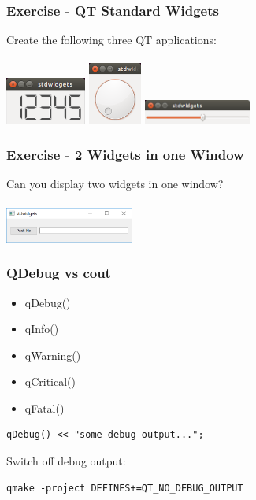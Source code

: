\begin{frame}[fragile]
\frametitle{Exercise - QT Standard Widgets}
\begin{exercise}
Create the following three QT applications:\\
\vspace{5mm}
\\
\includegraphics[width=75pt]{code/qt/stdwidgets/w1.png}
\hspace{5mm}
\includegraphics[width=50pt]{code/qt/stdwidgets/w2.png}
\hspace{5mm}
\includegraphics[width=100pt]{code/qt/stdwidgets/w3.png}
\end{exercise}
\end{frame}

\begin{frame}[fragile]
\frametitle{Exercise - 2 Widgets in one Window}
\begin{exercise}
Can you display two widgets in one window?\\
\vspace{5mm}
\\
\includegraphics[width=120pt]{code/qt/stdwidgets/w4.png}
\end{exercise}
\end{frame}


\begin{frame}[fragile]
\frametitle{QDebug vs cout}
\begin{itemize}
\item qDebug()
\item qInfo()
\item qWarning()
\item qCritical()
\item qFatal()
\end{itemize}

\begin{lstlisting}
qDebug() << "some debug output...";
\end{lstlisting}

Switch off debug output:
\begin{lstlisting}
qmake -project DEFINES+=QT_NO_DEBUG_OUTPUT
\end{lstlisting}

\end{frame}


